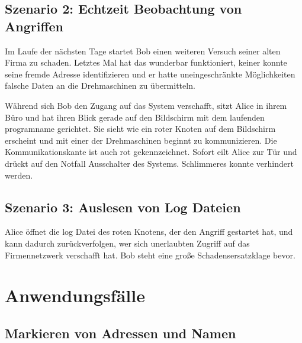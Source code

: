 \subsection{Szenario 2: Echtzeit Beobachtung von Angriffen}

Im Laufe der nächsten Tage startet Bob einen weiteren Versuch seiner alten Firma zu schaden. Letztes Mal hat das wunderbar funktioniert, keiner konnte seine fremde Adresse identifizieren und er hatte uneingeschränkte Möglichkeiten falsche Daten an die Drehmaschinen zu übermitteln.

Während sich Bob den Zugang auf das System verschafft, sitzt Alice in ihrem Büro und hat ihren Blick gerade auf den Bildschirm mit dem laufenden \gls{programname} gerichtet. Sie sieht wie ein roter Knoten auf dem Bildschirm erscheint und mit einer der Drehmaschinen beginnt zu kommunizieren. Die Kommunikationskante ist auch rot gekennzeichnet. Sofort eilt Alice zur Tür und drückt auf den Notfall Ausschalter des Systems. Schlimmeres konnte verhindert werden.

\subsection{Szenario 3: Auslesen von Log Dateien}

Alice öffnet die log Datei des roten Knotens, der den Angriff gestartet hat, und kann dadurch zurückverfolgen, wer sich unerlaubten Zugriff auf das Firmennetzwerk verschafft hat. Bob steht eine große Schadensersatzklage bevor.


\section{Anwendungsfälle}

\subsection{Markieren von Adressen und Namen}

